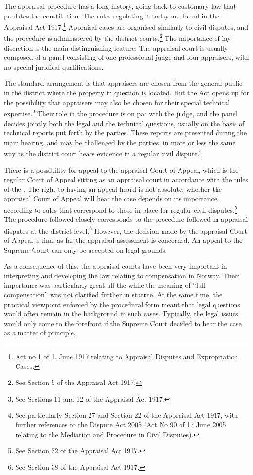The appraisal procedure has a long history, going back to customary law that predates the constitution. The rules regulating it today are found in the Appraisal Act 1917.\footnote{Act no 1 of 1. June 1917 relating to Appraisal Disputes and Expropriation Cases.} Appraisal cases are organised similarly to civil disputes, and the procedure is administered by the district courts.\footnote{See Section 5 of the Appraisal Act 1917.} The importance of lay discretion is the main distinguishing feature: The appraisal court is usually composed of a panel consisting of one professional judge and four appraisers, with no special juridical qualifications. 

The standard arrangement is that appraisers are chosen from the general public in the district where the property in question is located. But the Act opens up for the possibility that appraisers may also be chosen for their special technical expertise.\footnote{See Sections 11 and 12 of the Appraisal Act 1917.} Their role in the procedure is on par with the judge, and the panel decides jointly both the legal and the technical questions, usually on the basis of technical reports put forth by the parties. These reports are presented during the main hearing, and may be challenged by the parties, in more or less the same way as the district court hears evidence in a regular civil dispute.\footnote{See particularly Section 27 and Section 22 of the Appraisal Act 1917, with further references to the Dispute Act 2005 (Act No 90 of 17 June 2005 relating to the Mediation and Procedure in Civil Disputes).}

There is a possibility for appeal to the appraisal Court of Appeal, which is the regular Court of Appeal sitting as an appraisal court in accordance with the rules of the \cite{aa17}. The right to having an appeal heard is not absolute; whether the appraisal Court of Appeal will hear the case depends on its importance, according to rules that correspond to those in place for regular civil disputes.\footnote{See Section 32 of the Appraisal Act 1917.} The procedure followed closely corresponds to the procedure followed in appraisal disputes at the district level.\footnote{See Section 38 of the Appraisal Act 1917.} However, the decision made by the appraisal Court of Appeal is final as far the appraisal assessment is concerned. An appeal to the Supreme Court can only be accepted on legal grounds.

As a consequence of this, the appraisal courts have been very important in interpreting and developing the law relating to compensation in Norway. Their importance was particularly great all the while the meaning of ``full compensation'' was not clarified further in statute. At the same time, the practical viewpoint enforced by the procedural form meant that legal questions would often remain in the background in such cases. Typically, the legal issues would only come to the forefront if the Supreme Court decided to hear the case as a matter of principle. 

